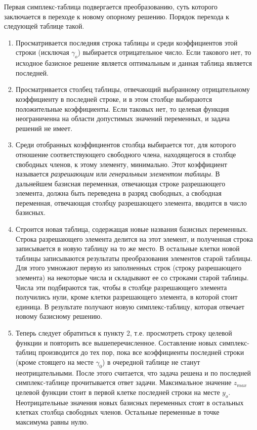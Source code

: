 Первая симплекс-таблица подвергается преобразованию, суть которого заключается в переходе к новому опорному решению. Порядок перехода к следующей таблице такой.
\begin{enumerate}
			\item Просматривается последняя строка таблицы и среди коэффициентов этой строки (исключая $\gamma_o$) выбирается отрицательное число. Если такового нет, то исходное базисное решение является оптимальным и данная  таблица является последней.
			\item Просматривается столбец таблицы, отвечающий выбранному отрицательному коэффициенту в последней строке, и в этом столбце выбираются положительные коэффициенты. Если таковых нет, то целевая функция  неограниченна на области допустимых значений переменных, и задача решений не имеет.
			\item Среди отобранных коэффициентов столбца выбирается тот, для которого отношение соответствующего свободного члена, находящегося  в столбце свободных членов, к этому элементу, минимально. Этот коэффициент называется \textit{разрешающим} или \textit{генеральным элементом таблицы}. В дальнейшем базисная переменная, отвечающая строке разрешающего элемента, должна быть переведена в разряд свободных, а  свободная переменная, отвечающая столбцу разрешающего элемента, вводится в число базисных.
			\item Строится новая таблица, содержащая новые названия базисных  переменных. Строка разрешающего элемента делится на этот элемент, и  полученная строка записывается в новую таблицу на то же место. В остальные клетки новой таблицы записываются результаты преобразования элементов  старой таблицы. Для этого умножают первую из заполненных строк (строку разрешающего элемента) на некоторые числа и  складывают ее со строками старой таблицы. Числа эти подбираются так, чтобы в  столбце разрешающего элемента получились  нули, кроме  клетки разрешающего элемента, в которой стоит единица. В результате получают новую  симплекс-таблицу, которая отвечает новому базисному решению.
			\item Теперь следует обратиться к пункту 2, т.е. просмотреть строку целевой функции и повторить все вышеперечисленное. Составление новых симплекс-таблиц производится до тех пор, пока все коэффициенты последней строки (кроме стоящего на месте $\gamma_0$) в очередной таблице не станут неотрицательными. После этого считается, что задача решена и по  последней  симплекс-таблице прочитывается ответ задачи. Максимальное значение $z_{max}$ целевой  функции стоит в первой клетке последней строки на месте $y_o$. Неотрицательные значения новых базисных переменных стоят в  остальных клетках столбца свободных членов. Остальные переменные в точке  максимума равны нулю.
		\end{enumerate}

